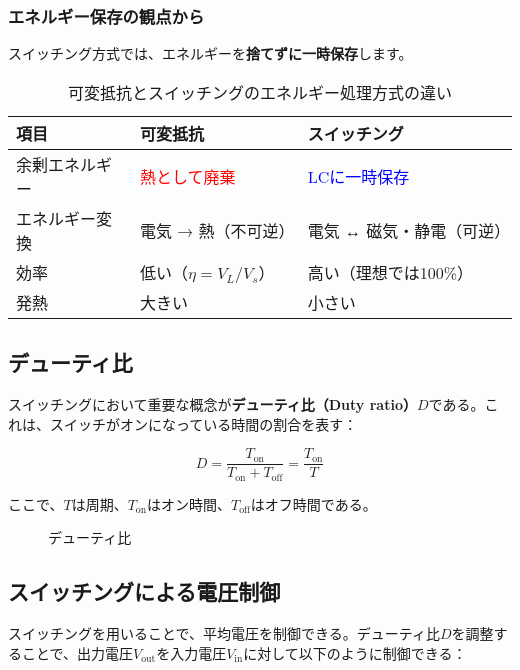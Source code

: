 \subsubsection{エネルギー保存の観点から}

スイッチング方式では、エネルギーを\textbf{捨てずに一時保存}します。

\begin{table}[H]
\centering
\caption{可変抵抗とスイッチングのエネルギー処理方式の違い}
\begin{tabular}{|l|l|l|}
\hline
\textbf{項目} & \textbf{可変抵抗} & \textbf{スイッチング} \\
\hline
\hline
余剰エネルギー & \textcolor{red}{熱として廃棄} & \textcolor{blue}{LCに一時保存} \\
\hline
エネルギー変換 & 電気 → 熱（不可逆） & 電気 ↔ 磁気・静電（可逆） \\
\hline
効率 & 低い（$\eta = V_L/V_s$） & 高い（理想では100\%） \\
\hline
発熱 & 大きい & 小さい \\
\hline
\end{tabular}
\end{table}

\subsection{デューティ比}

スイッチングにおいて重要な概念が\textbf{デューティ比（Duty ratio）}$D$である。これは、スイッチがオンになっている時間の割合を表す：

\begin{equation}
D = \frac{T_{\text{on}}}{T_{\text{on}} + T_{\text{off}}} = \frac{T_{\text{on}}}{T}
\end{equation}

ここで、$T$は周期、$T_{\text{on}}$はオン時間、$T_{\text{off}}$はオフ時間である。

\begin{figure}[H]
\centering
{}
\caption{デューティ比}
\label{fig:duty_ratio}
\end{figure}

\subsection{スイッチングによる電圧制御}

スイッチングを用いることで、平均電圧を制御できる。デューティ比$D$を調整することで、出力電圧$V_{\text{out}}$を入力電圧$V_{\text{in}}$に対して以下のように制御できる：

